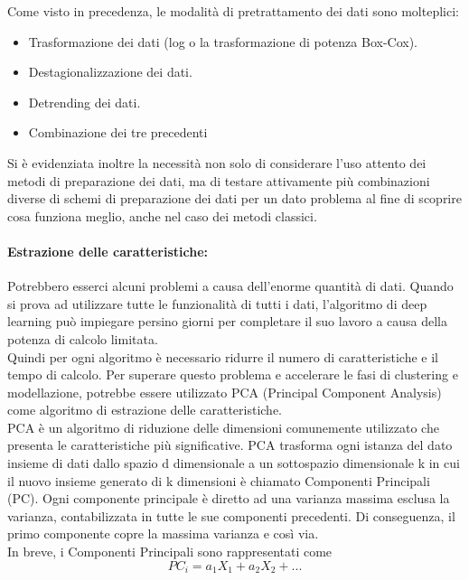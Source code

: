 \documentclass[12pt,a4paper]{report}
\begin{document}
Come visto in precedenza, le modalità di pretrattamento dei dati sono molteplici:
\begin{itemize}
    \item Trasformazione dei dati (log o la trasformazione di potenza Box-Cox).
    \item Destagionalizzazione dei dati.
    \item Detrending dei dati.
    \item Combinazione dei tre precedenti
\end{itemize}

Si è evidenziata inoltre la necessità non solo di considerare l'uso attento dei metodi di preparazione dei dati, ma di testare attivamente più combinazioni diverse di schemi di preparazione dei dati per un dato problema al fine di scoprire cosa funziona meglio, anche nel caso dei metodi classici.\\

\paragraph*{Estrazione delle caratteristiche:}
Potrebbero esserci alcuni problemi a causa dell'enorme quantità di dati. Quando si prova ad utilizzare tutte le funzionalità di tutti i dati, l'algoritmo di deep learning può impiegare persino giorni per completare il suo lavoro a causa della potenza di calcolo limitata. \cite{kilimci2019improved}\\
Quindi per ogni algoritmo è necessario ridurre il numero di caratteristiche e il tempo di calcolo. Per superare questo problema e accelerare le fasi di clustering e modellazione, potrebbe essere utilizzato PCA (Principal Component Analysis) come algoritmo di estrazione delle caratteristiche.\\
PCA è un algoritmo di riduzione delle dimensioni comunemente utilizzato che presenta le caratteristiche più significative. PCA trasforma ogni istanza del dato insieme di dati dallo spazio d dimensionale a un sottospazio dimensionale k in cui il nuovo insieme generato di k dimensioni è chiamato Componenti Principali (PC). Ogni componente principale è diretto ad una varianza massima esclusa la varianza, contabilizzata in tutte le sue componenti precedenti. Di conseguenza, il primo componente copre la massima varianza e così via.\\
In breve, i Componenti Principali sono rappresentati come \cite{kilimci2019improved}
\begin{equation}
    {\displaystyle PC_i = a_1X_1 + a_2X_2 + ...}
\end{equation}
\end{document}
